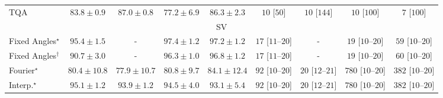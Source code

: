 \begin{tabular}{l|cccc|cccc|}
TQA & {\cellcolor[HTML]{2F944E}} \color[HTML]{F1F1F1} $83.8\pm 0.9$ & {\cellcolor[HTML]{1E8041}} \color[HTML]{F1F1F1} $87.0\pm 0.8$ & {\cellcolor[HTML]{61BB6D}} \color[HTML]{F1F1F1} $77.2\pm 6.9$ & {\cellcolor[HTML]{228343}} \color[HTML]{F1F1F1} $86.3\pm 2.3$ & {\cellcolor[HTML]{FFF6F2}} \color[HTML]{000000} $10$ [$50$] & {\cellcolor[HTML]{FFF6F2}} \color[HTML]{000000} $10$ [$144$] & {\cellcolor[HTML]{FFF6F2}} \color[HTML]{000000} $10$ [$100$] & {\cellcolor[HTML]{FFF6F2}} \color[HTML]{000000} $7$ [$100$] \\
\cline{1-9}
\multicolumn{9}{c}{\rule{0pt}{8pt}SV} \\
\midrule
Fixed Angles$^\star$ & {\cellcolor[HTML]{03446A}} \color[HTML]{F1F1F1} $95.4\pm 1.5$ & {\cellcolor[HTML]{000000}} \color[HTML]{F1F1F1} {\cellcolor{white}} \color{black} - & {\cellcolor[HTML]{023858}} \color[HTML]{F1F1F1} $97.4\pm 1.2$ & {\cellcolor[HTML]{02395A}} \color[HTML]{F1F1F1} $97.2\pm 1.2$ & {\cellcolor[HTML]{FFF3F0}} \color[HTML]{000000} $17$ [$11$--$20$] & {\cellcolor[HTML]{000000}} \color[HTML]{F1F1F1} {\cellcolor{white}} \color{black} - & {\cellcolor[HTML]{FFF3F0}} \color[HTML]{000000} $19$ [$10$--$20$] & {\cellcolor[HTML]{FEE9E6}} \color[HTML]{000000} $59$ [$10$--$20$] \\
Fixed Angles$^\dagger$ & {\cellcolor[HTML]{045E94}} \color[HTML]{F1F1F1} $90.7\pm 3.0$ & {\cellcolor[HTML]{000000}} \color[HTML]{F1F1F1} {\cellcolor{white}} \color{black} - & {\cellcolor[HTML]{023E62}} \color[HTML]{F1F1F1} $96.3\pm 1.0$ & {\cellcolor[HTML]{023B5D}} \color[HTML]{F1F1F1} $96.8\pm 1.2$ & {\cellcolor[HTML]{FFF3F0}} \color[HTML]{000000} $17$ [$11$--$20$] & {\cellcolor[HTML]{000000}} \color[HTML]{F1F1F1} {\cellcolor{white}} \color{black} - & {\cellcolor[HTML]{FFF3F0}} \color[HTML]{000000} $19$ [$10$--$20$] & {\cellcolor[HTML]{FEE9E6}} \color[HTML]{000000} $60$ [$10$--$20$] \\
Fourier$^\star$ & {\cellcolor[HTML]{3790C0}} \color[HTML]{F1F1F1} $80.4\pm 10.8$ & {\cellcolor[HTML]{529BC7}} \color[HTML]{F1F1F1} $77.9\pm 10.7$ & {\cellcolor[HTML]{348EBF}} \color[HTML]{F1F1F1} $80.8\pm 9.7$ & {\cellcolor[HTML]{167BB6}} \color[HTML]{F1F1F1} $84.1\pm 12.4$ & {\cellcolor[HTML]{FDE2DF}} \color[HTML]{000000} $92$ [$10$--$20$] & {\cellcolor[HTML]{FFF3EF}} \color[HTML]{000000} $20$ [$12$--$21$] & {\cellcolor[HTML]{49006A}} \color[HTML]{F1F1F1} $780$ [$10$--$20$] & {\cellcolor[HTML]{F76CA3}} \color[HTML]{F1F1F1} $382$ [$10$--$20$] \\
Interp.$^\star$ & {\cellcolor[HTML]{03466E}} \color[HTML]{F1F1F1} $95.1\pm 1.2$ & {\cellcolor[HTML]{034C78}} \color[HTML]{F1F1F1} $93.9\pm 1.2$ & {\cellcolor[HTML]{034973}} \color[HTML]{F1F1F1} $94.5\pm 4.0$ & {\cellcolor[HTML]{045280}} \color[HTML]{F1F1F1} $93.1\pm 5.4$ & {\cellcolor[HTML]{FDE2DF}} \color[HTML]{000000} $92$ [$10$--$20$] & {\cellcolor[HTML]{FFF3EF}} \color[HTML]{000000} $20$ [$12$--$21$] & {\cellcolor[HTML]{49006A}} \color[HTML]{F1F1F1} $780$ [$10$--$20$] & {\cellcolor[HTML]{F76CA3}} \color[HTML]{F1F1F1} $382$ [$10$--$20$] \\

\end{tabular}
